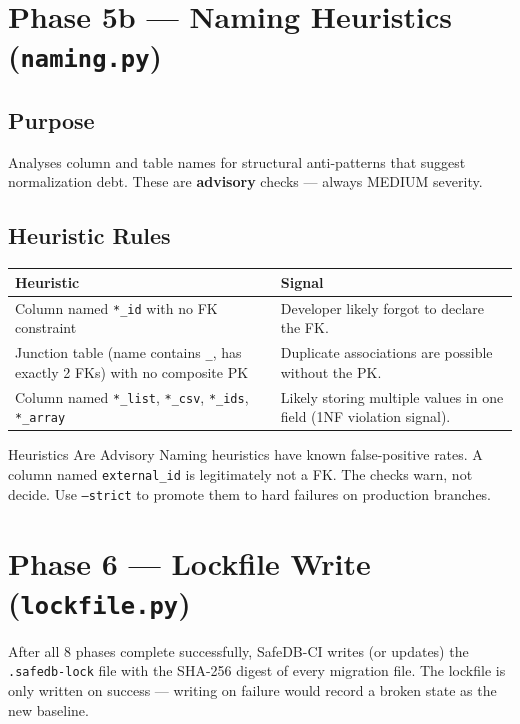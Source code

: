 \documentclass[12pt,a4paper]{report}
\begin{document}
\section{Phase 5b — Naming Heuristics (\texttt{naming.py})}

\subsection{Purpose}

Analyses column and table names for structural anti-patterns that suggest
normalization debt. These are \textbf{advisory} checks — always MEDIUM severity.

\subsection{Heuristic Rules}

\begin{center}
\begin{tabular}{@{}p{5cm}p{8cm}@{}}
\toprule
\textbf{Heuristic} & \textbf{Signal} \\
\midrule
Column named \texttt{*\_id} with no FK constraint &
  Developer likely forgot to declare the FK. \\
Junction table (name contains \texttt{\_}, has exactly 2 FKs) with no composite PK &
  Duplicate associations are possible without the PK. \\
Column named \texttt{*\_list}, \texttt{*\_csv}, \texttt{*\_ids}, \texttt{*\_array} &
  Likely storing multiple values in one field (1NF violation signal). \\
\bottomrule
\end{tabular}
\end{center}

\begin{infobox}{Heuristics Are Advisory}
Naming heuristics have known false-positive rates. A column named
\texttt{external\_id} is legitimately not a FK. The checks warn, not decide.
Use \texttt{--strict} to promote them to hard failures on production branches.
\end{infobox}

\section{Phase 6 — Lockfile Write (\texttt{lockfile.py})}

After all 8 phases complete successfully, SafeDB-CI writes (or updates) the
\texttt{.safedb-lock} file with the SHA-256 digest of every migration file.
The lockfile is only written on success — writing on failure would record a
broken state as the new baseline.
\end{document}
